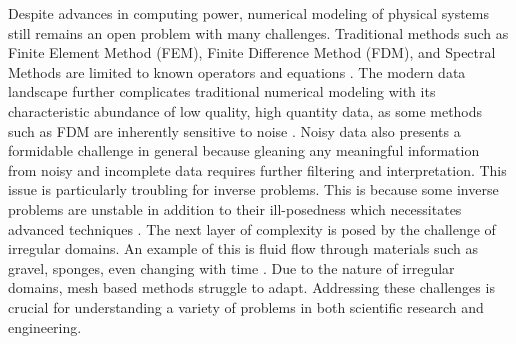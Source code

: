 Despite advances in computing power, numerical modeling of physical systems still remains an open problem with many challenges. Traditional methods such as Finite Element Method (FEM), Finite Difference Method (FDM), and Spectral Methods are limited to known operators and equations \autocite{karniadakisPhysicsinformedMachineLearning2021, du2024neural,fanaskovSpectralNeuralOperators2023,luLearningNonlinearOperators2021}. The modern data landscape further complicates traditional numerical modeling with its characteristic abundance of low quality, high quantity data, as some methods such as FDM are inherently sensitive to noise \autocite{dearagaoExplicitControlNumerical2021, huntulInverseProblemReconstructing2021}. Noisy data also presents a formidable challenge in general because gleaning any meaningful information from noisy and incomplete data requires further filtering and interpretation. This issue is particularly troubling for inverse problems. This is because some inverse problems are unstable in addition to their ill-posedness which necessitates advanced techniques \autocite{caubetInstabilityInverseProblem2013, mandacheExponentialInstabilityInverse2001}. The next layer of complexity is posed by the challenge of irregular domains. An example of this is fluid flow through materials such as gravel, sponges, even changing with time \autocite{liImmersedInterfaceMethod2006}. Due to the nature of irregular domains, mesh based methods struggle to adapt. Addressing these challenges is crucial for understanding a variety of problems in both scientific research and engineering.

